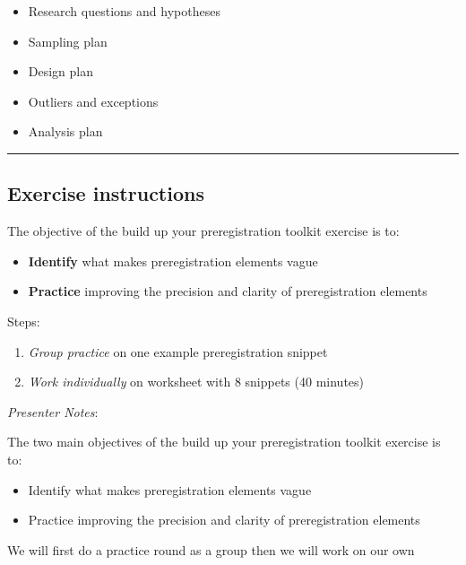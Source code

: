 \documentclass[
  letterpaper,
  DIV=11,
  numbers=noendperiod]{scrartcl}
\providecommand{\tightlist}{%
  \setlength{\itemsep}{0pt}\setlength{\parskip}{0pt}}
\begin{document}
\begin{itemize}
\tightlist
\item
  Research questions and hypotheses
\item
  Sampling plan
\item
  Design plan
\item
  Outliers and exceptions
\item
  Analysis plan
\end{itemize}

\begin{center}\rule{0.5\linewidth}{0.5pt}\end{center}

\subsection{Exercise instructions}\label{exercise-instructions}

The objective of the build up your preregistration toolkit exercise is
to:

\begin{itemize}
\tightlist
\item
  \textbf{Identify} what makes preregistration elements vague
\item
  \textbf{Practice} improving the precision and clarity of
  preregistration elements
\end{itemize}

Steps:

\begin{enumerate}
\def\labelenumi{\arabic{enumi}.}
\tightlist
\item
  \emph{Group practice} on one example preregistration snippet
\item
  \emph{Work individually} on worksheet with 8 snippets (40 minutes)
\end{enumerate}

\emph{Presenter Notes}:

The two main objectives of the build up your preregistration toolkit
exercise is to:

\begin{itemize}
\tightlist
\item
  Identify what makes preregistration elements vague
\item
  Practice improving the precision and clarity of preregistration
  elements
\end{itemize}

We will first do a practice round as a group then we will work on our
own
\end{document}
